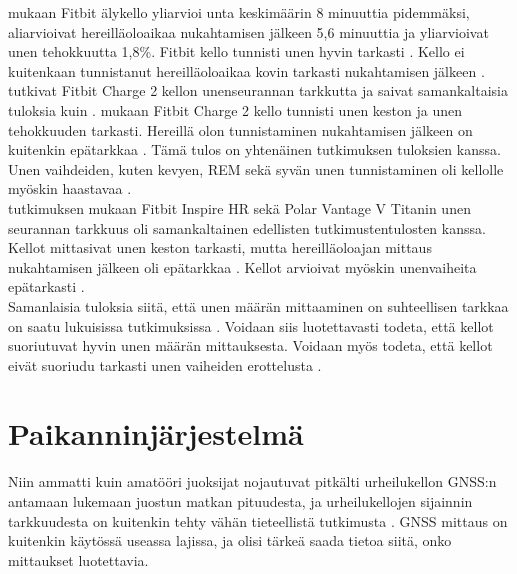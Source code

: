 \documentclass[utf8,bachelor,finnish]{bachelor}
\begin{document}
   \textcite{de_zambotti_measures_2016} mukaan Fitbit älykello yliarvioi unta keskimäärin
    8 minuuttia pidemmäksi, aliarvioivat hereilläoloaikaa nukahtamisen jälkeen 5,6 minuuttia ja yliarvioivat unen tehokkuutta 1,8\%.
     Fitbit kello tunnisti unen hyvin tarkasti \parencite{de_zambotti_measures_2016}.
      Kello ei kuitenkaan tunnistanut hereilläoloaikaa kovin tarkasti nukahtamisen jälkeen \parencite{de_zambotti_measures_2016}.\\
  
  \textcite{liang2018validity} tutkivat Fitbit Charge 2 kellon unenseurannan tarkkutta ja saivat samankaltaisia tuloksia
   kuin \textcite{de_zambotti_measures_2016}. \textcite{liang2018validity} mukaan Fitbit Charge 2 kello tunnisti unen keston
    ja unen tehokkuuden tarkasti. Hereillä olon tunnistaminen nukahtamisen jälkeen on kuitenkin
     epätarkkaa \parencite{liang2018validity}. Tämä tulos on yhtenäinen \textcite{de_zambotti_measures_2016} tutkimuksen tuloksien kanssa.
      Unen vaihdeiden, kuten kevyen, REM sekä syvän unen tunnistaminen oli kellolle myöskin haastavaa \parencite{liang2018validity}.\\
  
  \textcite{chinoy_performance_2022} tutkimuksen mukaan Fitbit Inspire HR sekä Polar Vantage V Titanin unen seurannan tarkkuus oli 
    samankaltainen edellisten tutkimustentulosten kanssa. Kellot mittasivat unen keston tarkasti,
     mutta hereilläoloajan mittaus nukahtamisen jälkeen oli epätarkkaa \parencite{chinoy_performance_2022}.
      Kellot arvioivat myöskin unenvaiheita epätarkasti \parencite{chinoy_performance_2022}.\\
  
  Samanlaisia tuloksia siitä, että unen määrän mittaaminen on suhteellisen tarkkaa on saatu lukuisissa tutkimuksissa
   \parencite{de_zambotti_measures_2016,liang2018validity,chinoy_performance_2022,miller_validation_2022}. Voidaan siis luotettavasti todeta, että kellot suoriutuvat
    hyvin unen määrän mittauksesta. Voidaan myös todeta, että kellot eivät suoriudu tarkasti unen vaiheiden erottelusta
     \parencite{chinoy_performance_2022,de_zambotti_measures_2016,liang2018validity}.
       
         
  \section{Paikanninjärjestelmä}
  Niin ammatti kuin amatööri juoksijat nojautuvat pitkälti urheilukellon GNSS:n antamaan lukemaan juostun matkan pituudesta,
  ja urheilukellojen sijainnin tarkkuudesta on kuitenkin tehty vähän tieteellistä tutkimusta \parencite{gilgen-ammann_accuracy_2020}.
   GNSS mittaus on kuitenkin käytössä useassa lajissa, ja olisi tärkeä saada tietoa siitä,
   onko mittaukset luotettavia. \\
\end{document}
